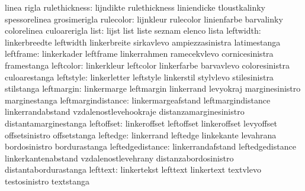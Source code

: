                            linea                     rigla
            rulethickness: lijndikte                 rulethickness
                           liniendicke               tloustkalinky
                           spessorelinea             grosimerigla
                rulecolor: lijnkleur                 rulecolor
                           linienfarbe               barvalinky
                           colorelinea               culoarerigla
                     list: lijst                     list
                           liste                     seznam
                           elenco                    lista
                leftwidth: linkerbreedte             leftwidth
                           linkerbreite              sirkavlevo
                           ampiezzasinistra          latimestanga
                leftframe: linkerkader               leftframe
                           linkerrahmen              ramecekvlevo
                           cornicesinistra           framestanga
                leftcolor: linkerkleur               leftcolor
                           linkerfarbe               barvavlevo
                           coloresinistra            culoarestanga
                leftstyle: linkerletter              leftstyle
                           linkerstil                stylvlevo
                           stilesinistra             stilstanga
               leftmargin: linkermarge               leftmargin
                           linkerrand                levyokraj
                           marginesinistro           marginestanga
       leftmargindistance: linkermargeafstand        leftmargindistance
                           linkerrandabstand         vzdalenostlevehookraje
                           distanzamarginesinistro   distantamarginestanga
               leftoffset: linkeroffset              leftoffset
                           linkeroffset              levyoffset
                           offsetsinistro            offsetstanga
                 leftedge: linkerrand                leftedge
                           linkekante                levahrana
                           bordosinistro             bordurastanga
         leftedgedistance: linkerrandafstand         leftedgedistance
                           linkerkantenabstand       vzdalenostlevehrany
                           distanzabordosinistro     distantabordurastanga
                 lefttext: linkertekst               lefttext
                           linkertext                textvlevo
                           testosinistro             textstanga %
